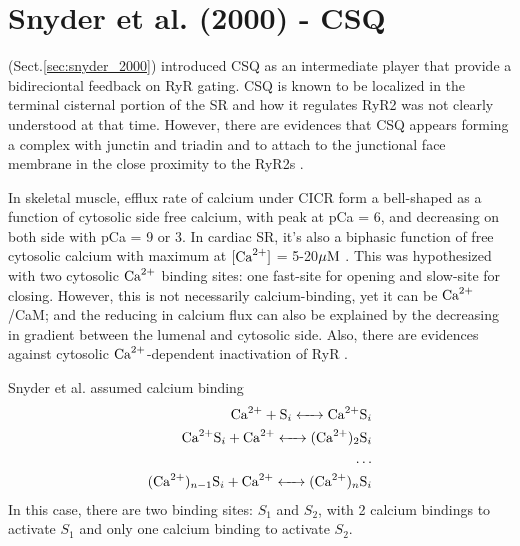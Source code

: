 \section{Snyder et al. (2000) - CSQ}
\label{sec:RYR_Snyder2000_CSQ}

\citep{snyder2000mmc} (Sect.\ref{sec:snyder_2000}) introduced CSQ as an
intermediate player that provide a bidireciontal feedback on RyR gating.
CSQ is known to be localized in the terminal cisternal portion of the SR and how
it regulates RyR2 was not clearly understood at that time. However, there are
evidences that CSQ appears forming a complex with junctin and triadin and
to attach to the junctional face membrane in the close proximity to the RyR2s
\citep{zhang1997, brandt1990}.

In skeletal muscle, efflux rate of calcium under CICR form a bell-shaped as a
function of cytosolic side free calcium, with peak at pCa = 6, and decreasing on
both side with pCa = 9 or 3. In cardiac SR, it's also a biphasic function of
free cytosolic calcium with maximum at $[{\text{Ca}^{2+}}]$ = 5-20${\mu\text{M}}$
\citep{Coronado1994}. This was hypothesized with two cytosolic ${\text{Ca}^{2+}}$ binding
sites: one fast-site for opening and slow-site for closing. However, this is not
necessarily calcium-binding, yet it can be ${\text{Ca}^{2+}}$/CaM; and the reducing in
calcium flux can also be explained by the decreasing in gradient between the
lumenal and cytosolic side. Also, there are evidences against
cytosolic ${\text{Ca}^{2+}}$-dependent inactivation of RyR \citep{Liu2013}.

Snyder et al. assumed calcium binding
\begin{equation}
\begin{split}
\ce{Ca^2+ + S_i <-> Ca^2+S_i} \\
\ce{Ca^2+S_i + Ca^2+ <-> (Ca^2+)_2S_i} \\
\ldots \\
\ce{(Ca^2+)_{n-1}S_i + Ca^2+ <-> (Ca^2+)_nS_i} \\
\end{split}
\end{equation}
In this case, there are two binding sites: $S_1$ and $S_2$, with 2 calcium
bindings to activate $S_1$ and only one calcium binding to activate $S_2$.

